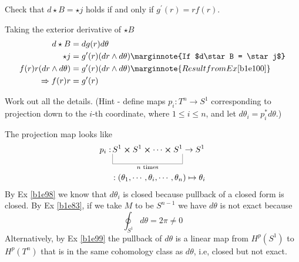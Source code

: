 \documentclass[10pt]{article}
\begin{document}
\begin{example}
	Check that $d\star B = \star j$ holds if and only if $g^\prime(r) = rf(r)$.
\end{example}
\sol Taking the exterior derivative of $\star B$
$$
\begin{aligned}
	d\star B &= dg(r)d\theta\\
	\star j &= g^\prime(r)(dr \wedge d\theta)\marginnote{If $d\star B = \star j$}\\
	f(r)r(dr \wedge d\theta) &= g^\prime(r)(dr \wedge d\theta)\marginnote{Result from Ex \ref{b1e100}}\\
	\Rightarrow f(r)r &= g^\prime(r)
\end{aligned}
$$


\begin{example}
	Work out all the details. (Hint - define maps $p_i:T^n \to S^1$ corresponding to projection down to the $i$-th coordinate, where $1 \le i \le n$, and let $d\theta_i = p_i^*d\theta$.)
\end{example}
\sol The projection map looks like
$$
\begin{aligned}
	p_i:&\ub{S^1 \cross S^1\cross \cdots \cross S^1}{n\text{ times}} \to S^1\\
	&:(\theta_1, \cdots, \theta_i, \cdots, \theta_n) \mapsto \theta_i
\end{aligned}
$$
By Ex \ref{b1e98} we know that $d\theta_i$ is closed because pullback of a closed form is closed. By Ex \ref{b1e83}, if we take $M$ to be $S^{n-1}$ we have $d\theta$ is not exact because
$$
\oint_{S^1} d\theta = 2\pi \ne 0
$$
Alternatively, by Ex \ref{b1e99} the pullback of $d\theta$ is a linear map from $H^p(S^1)$ to $H^p(T^n)$ that is in the same cohomology class as $d\theta$, i.e, closed but not exact.
\end{document}
